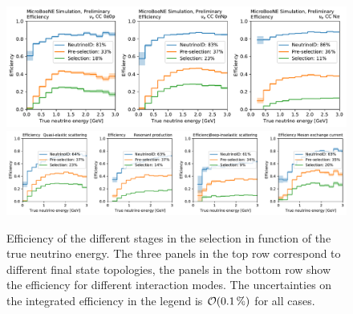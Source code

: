 \begin{figure}[htb]
    \centering
    \includegraphics[width=\textwidth]{NueCCsel/Images/truth/efficiency_cat_2.pdf}
    \includegraphics[width=\textwidth]{NueCCsel/Images/truth/efficiency_int.pdf}
    \caption[Efficiency of the different stages in the \nuecc selection in function of the true neutrino energy]{Efficiency of the different stages in the \nuecc selection in function of the true neutrino energy. The three panels in the top row correspond to different final state topologies, the panels in the bottom row show the efficiency for different interaction modes. The uncertainties on the integrated efficiency in the legend is $\order{\pct{0.1}}$ for all cases.}
    \label{fig:nuecc:eff}
\end{figure}